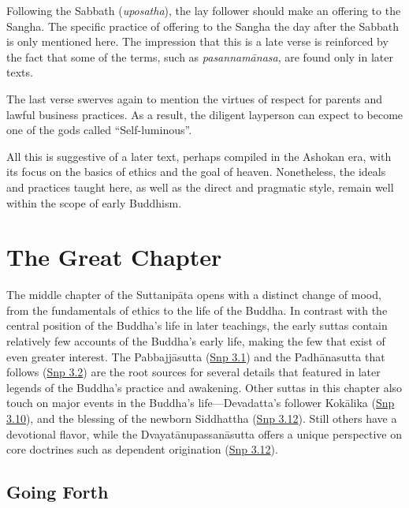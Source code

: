 \documentclass[12pt,openany]{book}%
\begin{document}
Following the Sabbath (\textit{uposatha}), the lay follower should make an offering to the Sangha. The specific practice of offering to the Sangha the day after the Sabbath is only mentioned here. The impression that this is a late verse is reinforced by the fact that some of the terms, such as \textit{\textsanskrit{pasannamānasa}}, are found only in later texts.

The last verse swerves again to mention the virtues of respect for parents and lawful business practices. As a result, the diligent layperson can expect to become one of the gods called “Self-luminous”.

All this is suggestive of a later text, perhaps compiled in the Ashokan era, with its focus on the basics of ethics and the goal of heaven. Nonetheless, the ideals and practices taught here, as well as the direct and pragmatic style, remain well within the scope of early Buddhism.

\section*{The Great Chapter}

The middle chapter of the \textsanskrit{Suttanipāta} opens with a distinct change of mood, from the fundamentals of ethics to the life of the Buddha. In contrast with the central position of the Buddha’s life in later teachings, the early suttas contain relatively few accounts of the Buddha’s early life, making the few that exist of even greater interest. The \textsanskrit{Pabbajjāsutta} (\href{https://suttacentral.net/snp3.1/en/sujato}{Snp 3.1}) and the \textsanskrit{Padhānasutta} that follows (\href{https://suttacentral.net/snp3.2/en/sujato}{Snp 3.2}) are the root sources for several details that featured in later legends of the Buddha’s practice and awakening. Other suttas in this chapter also touch on major events in the Buddha’s life—Devadatta’s follower \textsanskrit{Kokālika} (\href{https://suttacentral.net/snp3.10/en/sujato}{Snp 3.10}), and the blessing of the newborn Siddhattha (\href{https://suttacentral.net/snp3.12/en/sujato}{Snp 3.12}). Still others have a devotional flavor, while the \textsanskrit{Dvayatānupassanāsutta} offers a unique perspective on core doctrines such as dependent origination (\href{https://suttacentral.net/snp3.12/en/sujato}{Snp 3.12}).

\subsection*{Going Forth}
\end{document}
